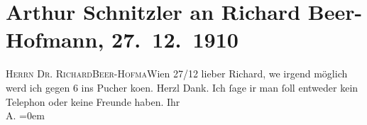 

         
         \renewcommand{\erwaehntePersonen}{Personen: Richard Beer-Hofmann}
         \renewcommand{\erwaehnteOrte}{Orte: Café Pucher, Wien}
         \renewcommand{\erwaehnteWerke}{}
               \section[Arthur Schnitzler an Richard Beer-Hofmann, 27. 12. 1910]{ Arthur Schnitzler an Richard Beer-Hofmann, 27. 12. 1910}\nopagebreak{}\rehead{ }\begin{ledgroupsized}[t]{13cm}\normalsize\beginnumbering \toendnotes[C]{\smallbreak\pagebreak[2]} 
\pstart{}{\pb}\textsc{Herrn Dr. Richard}\pend{}\pstart{}\textsc{Beer-Hofma{\geminationn}}\pend{}\pstart{}Wien\pend{}{\bigskip}\pstart
           \raggedleft{}{\pb}27/12\pend
           \pstart{}lieber Richard,\pend\pstart
           we{\geminationn} irgend möglich werd ich gegen 6 ins Pucher ko{\geminationm}en. Herzl
               Dank. Ich ſage i{\geminationm}r man ſoll entweder kein Telephon oder
               keine Freunde haben.\pend
           \pstart
           Ihr{\\[\baselineskip]}\spacefill\mbox{A.}\pend
           \leftskip=0em{}
         
         \endnumbering{}\end{ledgroupsized}  \newcommand{\dateiname}{L01996}\newcommand{\titel}{Arthur Schnitzler an Richard Beer-Hofmann, 27. 12. 1910}\newcommand{\editorInnen}{Martin Anton Müller und Gerd-Hermann Susen}
      